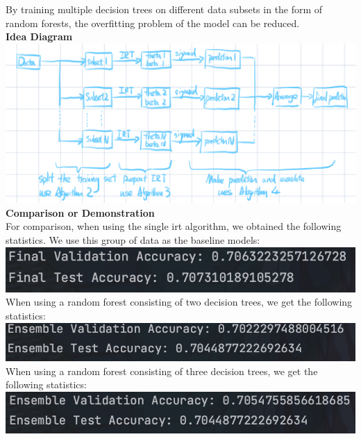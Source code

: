 \documentclass{article}
\begin{document}
\begin{enumerate}
    By training multiple decision trees on different data subsets in the form of random forests, the overfitting problem of the model can be reduced. \vspace{30}\\
    \textbf{Idea Diagram} \vspace{15}\\
    \includegraphics[width=1.0\linewidth]{笔记 2024年8月9日.jpeg} \vspace{30}\\
    \textbf{Comparison or Demonstration} \vspace{10}\\
    For comparison, when using the single irt algorithm, we obtained the following statistics. We use this group of data as the baseline models: \vspace{10}\\
    \includegraphics[width=0.7\linewidth]{6061723195551_.pic.jpg} \vspace{10}\\
    When using a random forest consisting of two decision trees, we get the following statistics:
    \vspace{10}\\
    \includegraphics[width=0.7\linewidth]{6081723195750_.pic.jpg} \vspace{10}\\
    When using a random forest consisting of three decision trees, we get the following statistics: \vspace{10}\\
    \includegraphics[width=0.7\linewidth]{6101723195879_.pic.jpg} \vspace{10}\\


\end{enumerate}
\end{document}
